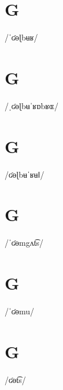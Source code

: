 \documentclass[10pt,a4paper,twoside]{book}
\begin{document}
\section*{G}

\begin{multicols}{3}
 {/ˈʛɵɭbʉʁ/} {}
\end{multicols}

\section*{G}

\begin{multicols}{3}
 {/ˌʛɵɭbʉˈʁɒbʁɶ/} {}
\end{multicols}

\section*{G}

\begin{multicols}{3}
 {/ʛɵɭbʉˈʁʉǁ/} {}
\end{multicols}

\section*{G}

\begin{multicols}{3}
 {/ˈʛɵmgʌt͡s/} {}
\end{multicols}

\section*{G}

\begin{multicols}{3}
 {/ˈʛɵmu/} {}
\end{multicols}

\section*{G}

\begin{multicols}{3}
 {/ʛɵt͡s/} {}
\end{multicols}
\end{document}
